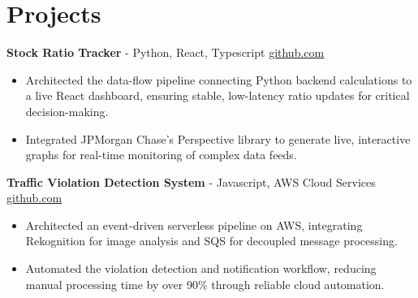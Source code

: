 \documentclass[11pt]{article}       %
\begin{document}

\vspace{-18.5pt}

\section*{Projects}

\textbf{Stock Ratio Tracker}{ - Python, React, Typescript} \hfill \href{https://github.com/Monica20030707/tradingDashboard-UI}{github.com} \\
\vspace{-9pt}
\begin{itemize}
  \item Architected the data-flow pipeline connecting Python backend calculations to a live React dashboard, ensuring stable, low-latency ratio updates for critical decision-making. 
  \item Integrated JPMorgan Chase’s Perspective library to generate live, interactive graphs for real-time monitoring of complex data feeds.
\end{itemize}

\textbf{Traffic Violation Detection System}{ - Javascript, AWS Cloud Services} \hfill \href{https://github.com/Monica20030707/AWS_rekonigition-N-read-database}{github.com} \\
\vspace{-9pt}
\begin{itemize}
  \item Architected an event-driven serverless pipeline on AWS, integrating Rekognition for image analysis and SQS for decoupled message processing.
  \item Automated the violation detection and notification workflow, reducing manual processing time by over 90\% through reliable cloud automation.
\end{itemize}
\end{document}
